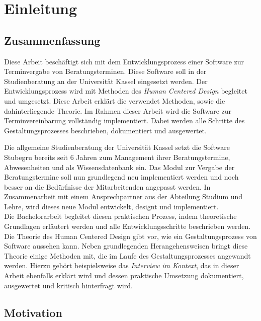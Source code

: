 \chapter{Einleitung}

\section{Zusammenfassung}

Diese Arbeit beschäftigt sich mit dem Entwicklungsprozess einer Software zur
Terminvergabe von Beratungsterminen. Diese Software soll in der Studienberatung
an der Universität Kassel eingesetzt werden. Der Entwicklungsprozess wird mit
Methoden des \textit{Human Centered Design} begleitet und umgesetzt. Diese
Arbeit erklärt die verwendet Methoden, sowie die dahinterliegende Theorie. Im
Rahmen dieser Arbeit wird die Software zur Terminvereinbarung vollständig
implementiert. Dabei werden alle Schritte des Gestaltungsprozesses beschrieben,
dokumentiert und ausgewertet.

Die allgemeine Studienberatung der Universität Kassel setzt die Software
Stubegru bereits seit 6 Jahren zum Management ihrer Beratungstermine,
Abwesenheiten und als Wissensdatenbank ein. Das Modul zur Vergabe der
Beratungstermine soll nun grundlegend neu implementiert werden und noch besser
an die Bedürfnisse der Mitarbeitenden angepasst werden. In Zusammenarbeit mit
einem Ansprechpartner aus der Abteilung Studium und Lehre, wird dieses neue
Modul entwickelt, designt und implementiert.\\ Die Bachelorarbeit begleitet
diesen praktischen Prozess, indem theoretische Grundlagen erläutert werden und
alle Entwicklungsschritte beschrieben werden. Die Theorie des Human Centered
Design gibt vor, wie ein Gestaltungsprozess von Software aussehen kann. Neben
grundlegenden Herangehensweisen bringt diese Theorie einige Methoden mit, die
im Laufe des Gestaltungsprozesses angewandt werden. Hierzu gehört
beispielsweise das \textit{Interview im Kontext}, das in dieser Arbeit
ebenfalls erklärt wird und dessen praktische Umsetzung dokumentiert,
ausgewertet und kritisch hinterfragt wird.

\section{Motivation}

